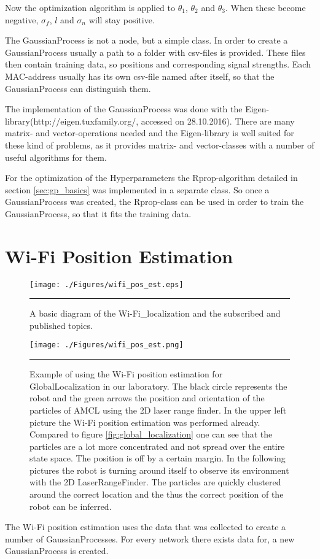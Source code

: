 Now the optimization algorithm is applied to $\theta_1$, $\theta_2$ and $\theta_3$. When these become negative, $\sigma_f$, $l$ and $\sigma_n$ will stay positive. 

The \Gls{GaussianProcess} is not a node, but a simple class. In order to create a \Gls{GaussianProcess} usually a path to a folder with csv-files is provided. These files then contain training data, so positions and corresponding signal strengths. Each \Gls{MAC-address} usually has its own csv-file named after itself, so that the \Gls{GaussianProcess} can distinguish them.

The implementation of the \Gls{GaussianProcess} was done with the Eigen-library(http://eigen.tuxfamily.org/, accessed on 28.10.2016). There are many matrix- and vector-operations needed and the Eigen-library is well suited for these kind of problems, as it provides matrix- and vector-classes with a number of useful algorithms for them. 

For the optimization of the \gls{Hyperparameter}s the Rprop-algorithm detailed in section \ref{sec:gp_basics} was implemented in a separate class. So once a \Gls{GaussianProcess} was created, the Rprop-class can be used in order to train the \Gls{GaussianProcess}, so that it fits the training data. 

\section{Wi-Fi Position Estimation}\label{sec:wifiposest}
\begin{figure}[htbp]
	\centering
		\texttt{[image: ./Figures/wifi\_pos\_est.eps]}
		\rule{35em}{0.5pt}
	\caption[Diagram of the Wi-Fi\_localization]{A basic diagram of the Wi-Fi\_localization and the subscribed and published topics.}
	\label{fig:ros_localization}
\end{figure}
\begin{figure}[htbp]
	\centering
		\texttt{[image: ./Figures/wifi\_pos\_est.png]}
		\rule{35em}{0.5pt}
	\caption[Wi-Fi position estimation example]{Example of using the Wi-Fi position estimation for \gls{GlobalLocalization} in our laboratory. The black circle represents the robot and the green arrows the position and orientation of the particles of AMCL using the 2D laser range finder. In the upper left picture the Wi-Fi position estimation was performed already. Compared to figure \ref{fig:global_localization} one can see that the particles are a lot more concentrated and not spread over the entire state space. The position is off by a certain margin. In the following pictures the robot is turning around itself to observe its environment with the 2D \gls{LaserRangeFinder}. The particles are quickly clustered around the correct location and the thus the correct position of the robot can be inferred.}
	\label{fig:wifi_pos_est_example}
\end{figure}
The Wi-Fi position estimation uses the data that was collected to create a number of \Gls{GaussianProcess}es. For every network there exists data for, a new \Gls{GaussianProcess} is created. 

